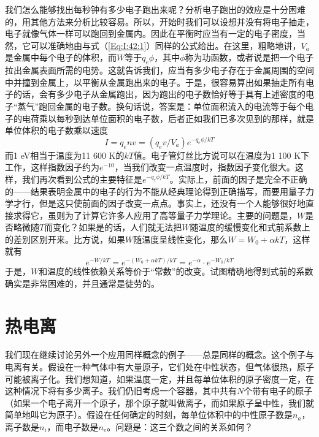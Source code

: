 我们怎么能够找出每秒钟有多少电子跑出来呢？分析电子跑出的效应是十分困难的，用其他方法来分析比较容易。所以，开始时我们可以设想并没有将电子抽走，电子就像气体一样可以跑回到金属内。因此在平衡时应当有一定的电子密度，当然，它可以准确地由与式（\ref{Eq:I:42:1}）同样的公式给出。在这里，粗略地讲，$V_a$是金属中每个电子的体积，而$W$等于$q_e \phi$，其中$\phi$称为功函数，或者说是把一个电子拉出金属表面所需的电势。这就告诉我们，应当有多少电子存在于金属周围的空间中并撞到金属上，以平衡从金属跑出来的电子。于是，很容易算出如果抽走所有电子的话，会有多少电子从金属跑出，因为跑出的电子数恰好等于具有上述密度的电子“蒸气”跑回金属的电子数。换句话说，答案是：单位面积流入的电流等于每个电子的电荷乘以每秒到达单位面积的电子数，后者正如我们已多次见到的那样，就是单位体积的电子数乘以速度
\begin{equation}
    \label{Eq:I:42:6}
    I=q_env=(q_ev/V_a)e^{-q_e\phi/kT}
\end{equation}
而1 eV相当于温度为11 600 K的$kT$值。电子管灯丝比方说可以在温度为1 100 K下工作，这样指数因子约为$e^{-10}$，当我们改变一点温度时，指数因子变化很大。这样，我们再次看到公式的主要特征是$e^{-q_e\phi/kT}$。实际上，前面的因子是完全不正确的——结果表明金属中的电子的行为不能从经典理论得到正确描写，而要用量子力学才行，但是这只使前面的因子改变一点点。事实上，还没有一个人能够很好地直接求得它，虽则为了计算它许多人应用了高等量子力学理论。主要的问题是，$W$是否略微随$T$而变化？如果是的话，人们就无法把$W$随温度的缓慢变化和式前系数上的差别区别开来。比方说，如果$W$随温度呈线性变化，那么$W=W_0+\alpha kT$，这样就有
\begin{equation*}
    e^{-W/kT} = e^{-(W_0+\alpha kT)/kT} = e^{-\alpha}\cdot e^{-W_0/kT}
\end{equation*}
于是，$W$和温度的线性依赖关系等价于“常数”的改变。试图精确地得到式前的系数确实是非常困难的，并且通常是徒劳的。

\section{热电离}

我们现在继续讨论另外一个应用同样概念的例子——总是同样的概念。这个例子与电离有关。假设在一种气体中有大量原子，它们处在中性状态，但气体很热，原子可能被离子化。我们想知道，如果温度一定，并且每单位体积的原子密度一定，在这种情况下将有多少离子。我们仍旧考虑一个容器，其中共有$N$个带有电子的原子（如果一个电子离开一个原子，那个原子就叫做离子，而如果原子呈中性，我们就简单地叫它为原子）。假设在任何确定的时刻，每单位体积中的中性原子数是$n_a$，离子数是$n_i$，而电子数是$n_e$。问题是：这三个数之间的关系如何？

